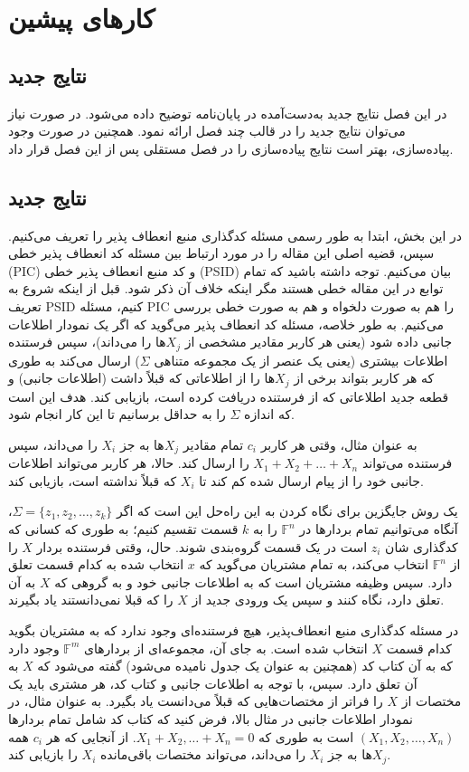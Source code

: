 \chapter{کارهای پیشین}
\section{نتایج جدید}

در این فصل نتایج جدید به‌دست‌آمده در پایان‌نامه توضیح داده می‌شود.
در صورت نیاز می‌توان نتایج جدید را در قالب چند فصل ارائه نمود.
همچنین در صورت وجود پیاده‌سازی، بهتر است نتایج پیاده‌سازی را
در فصل مستقلی پس از این فصل قرار داد.

\section{نتایج جدید}\label{sec3}
در این بخش، ابتدا به طور رسمی مسئله کدگذاری منبع انعطاف پذیر را تعریف می‌کنیم. سپس، قضیه اصلی این مقاله را در مورد ارتباط بین مسئله کد انعطاف پذیر خطی (PIC) و کد منبع انعطاف پذیر خطی (PSID) بیان می‌کنیم. توجه داشته باشید که تمام توابع در این مقاله خطی هستند مگر اینکه خلاف آن ذکر شود.
قبل از اینکه شروع به تعریف PSID کنیم، مسئله PIC را هم به صورت دلخواه و هم به صورت خطی بررسی می‌کنیم. به طور خلاصه، مسئله کد انعطاف پذیر می‌گوید که اگر یک نمودار اطلاعات جانبی داده شود (یعنی هر کاربر مقادیر مشخصی از $X_j$ها را می‌داند)، سپس فرستنده اطلاعات بیشتری (یعنی یک عنصر از یک مجموعه متناهی $\Sigma$) ارسال می‌کند به طوری که هر کاربر بتواند برخی از $X_j$ها را از اطلاعاتی که قبلاً داشت (اطلاعات جانبی) و قطعه جدید اطلاعاتی که از فرستنده دریافت کرده است، بازیابی کند. هدف این است که اندازه $\Sigma$ را به حداقل برسانیم تا این کار انجام شود.

به عنوان مثال، وقتی هر کاربر $c_i$ تمام مقادیر $X_j$ها به جز $X_i$ را می‌داند، سپس فرستنده می‌تواند $X_1+X_2+\ldots +X_n$ را ارسال کند. حالا، هر کاربر می‌تواند اطلاعات جانبی خود را از پیام ارسال شده کم کند تا $X_i$ که قبلاً نداشته است، بازیابی کند.

یک روش جایگزین برای نگاه کردن به این راه‌حل این است که اگر $\Sigma =\{z_1, z_2, \ldots, z_k\}$، آنگاه می‌توانیم تمام بردارها در $\mathbb{F}^n$ را به $k$ قسمت تقسیم کنیم؛ به طوری که کسانی که کدگذاری شان $z_i$ است در یک قسمت گروه‌بندی شوند. حال، وقتی فرستنده بردار $X$ را از $\mathbb{F}^n$ انتخاب می‌کند، به تمام مشتریان می‌گوید که $x$ انتخاب شده به کدام قسمت تعلق دارد. سپس وظیفه مشتریان است که به اطلاعات جانبی خود و به گروهی که $X$ به آن تعلق دارد، نگاه کنند و سپس یک ورودی جدید از $X$ را که قبلا نمی‌دانستند یاد بگیرند.

در مسئله کدگذاری منبع انعطاف‌پذیر، هیچ فرستنده‌ای وجود ندارد که به مشتریان بگوید کدام قسمت $X$ انتخاب شده است. به جای آن، مجموعه‌ای از بردارهای $\mathbb{F}^m$ وجود دارد که به آن کتاب کد (همچنین به عنوان یک جدول نامیده می‌شود) گفته می‌شود که $X$ به آن تعلق دارد. سپس، با توجه به اطلاعات جانبی و کتاب کد، هر مشتری باید یک مختصات از $X$ را فراتر از مختصات‌هایی که قبلاً می‌دانست یاد بگیرد. به عنوان مثال، در نمودار اطلاعات جانبی در مثال بالا، فرض کنید که کتاب کد شامل تمام بردارها $(X_1, X_2, \ldots, X_n)$ است به طوری که $X_1 + X_2, \ldots + X_n = 0$. از آنجایی که هر $c_i$ همه $X_j$‌ها به جز $X_i$ را می‌داند، می‌تواند مختصات باقی‌مانده $X_i$ را بازیابی کند.

